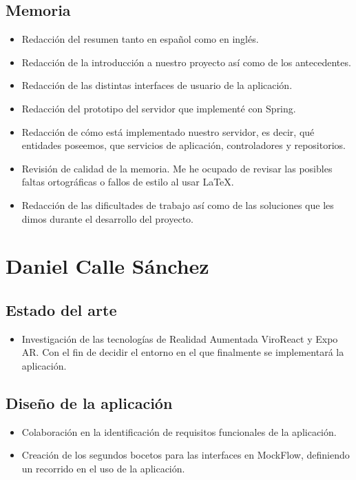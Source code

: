     \subsection{Memoria}
    \label{makereference7.1.3}
        \begin{itemize}
            \item Redacción del resumen tanto en español como en inglés.
            \item Redacción de la introducción a nuestro proyecto así como de los antecedentes.
            \item Redacción de las distintas interfaces de usuario de la aplicación.
            \item Redacción del prototipo del servidor que implementé con Spring.
            \item Redacción de cómo está implementado nuestro servidor, es decir, qué entidades poseemos, que servicios de aplicación, controladores y repositorios.
            \item Revisión de calidad de la memoria. Me he ocupado de revisar las posibles faltas ortográficas o fallos de estilo al usar LaTeX.
            \item Redacción de las dificultades de trabajo así como de las soluciones que les dimos durante el desarrollo del proyecto.
        \end{itemize}

\section{Daniel Calle Sánchez}
\label{makereference7.2}
    \subsection{Estado del arte}
    \label{makereference7.2.1}
        \begin{itemize}
            \item Investigación de las tecnologías de Realidad Aumentada ViroReact y
            Expo AR. Con el fin de decidir el entorno en el que finalmente se implementará la aplicación.
        \end{itemize}
    \subsection{Diseño de la aplicación}
    \label{makereference7.2.2}
        \begin{itemize}
            \item Colaboración en la identificación de requisitos funcionales de la aplicación.
            \item Creación de los segundos bocetos para las interfaces en
             MockFlow, definiendo un recorrido en el uso de la aplicación.
        \end{itemize}
